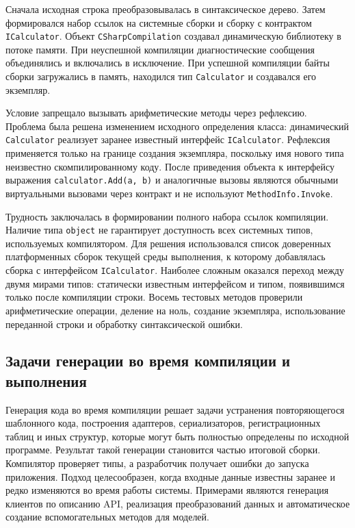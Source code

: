 Сначала исходная строка преобразовывалась в синтаксическое дерево. Затем формировался набор ссылок на системные сборки и сборку с контрактом \texttt{ICalculator}. Объект \texttt{CSharpCompilation} создавал динамическую библиотеку в потоке памяти. При неуспешной компиляции диагностические сообщения объединялись и включались в исключение. При успешной компиляции байты сборки загружались в память, находился тип \texttt{Calculator} и создавался его экземпляр.

Условие запрещало вызывать арифметические методы через рефлексию. Проблема была решена изменением исходного определения класса: динамический \texttt{Calculator} реализует заранее известный интерфейс \texttt{ICalculator}. Рефлексия применяется только на границе создания экземпляра, поскольку имя нового типа неизвестно скомпилированному коду. После приведения объекта к интерфейсу выражения \texttt{calculator.Add(a, b)} и аналогичные вызовы являются обычными виртуальными вызовами через контракт и не используют \texttt{MethodInfo.Invoke}.

Трудность заключалась в формировании полного набора ссылок компиляции. Наличие типа \texttt{object} не гарантирует доступность всех системных типов, используемых компилятором. Для решения использовался список доверенных платформенных сборок текущей среды выполнения, к которому добавлялась сборка с интерфейсом \texttt{ICalculator}. Наиболее сложным оказался переход между двумя мирами типов: статически известным интерфейсом и типом, появившимся только после компиляции строки. Восемь тестовых методов проверили арифметические операции, деление на ноль, создание экземпляра, использование переданной строки и обработку синтаксической ошибки.

\subsection{Задачи генерации во время компиляции и выполнения}

Генерация кода во время компиляции решает задачи устранения повторяющегося шаблонного кода, построения адаптеров, сериализаторов, регистрационных таблиц и иных структур, которые могут быть полностью определены по исходной программе. Результат такой генерации становится частью итоговой сборки. Компилятор проверяет типы, а разработчик получает ошибки до запуска приложения. Подход целесообразен, когда входные данные известны заранее и редко изменяются во время работы системы. Примерами являются генерация клиентов по описанию API, реализация преобразований данных и автоматическое создание вспомогательных методов для моделей.

